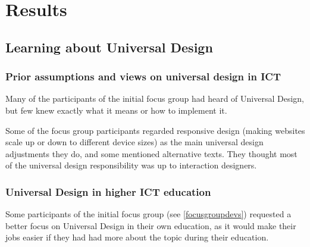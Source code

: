 \chapter{Results}

\section{Learning about Universal Design}
\subsection{Prior assumptions and views on universal design in ICT}
Many of the participants of the initial focus group had heard of Universal Design, but few knew exactly what it means or how to implement it. 

Some of the focus group participants regarded responsive design (making websites scale up or down to different device sizes) as the main universal design adjustments they do, and some mentioned alternative texts. They thought most of the universal design responsibility was up to interaction designers.

\subsection{Universal Design in higher ICT education}
Some participants of the initial focus group (see \ref{focusgroupdevs}) requested a better focus on Universal Design in their own education, as it would make their jobs easier if they had had more about the topic during their education.

